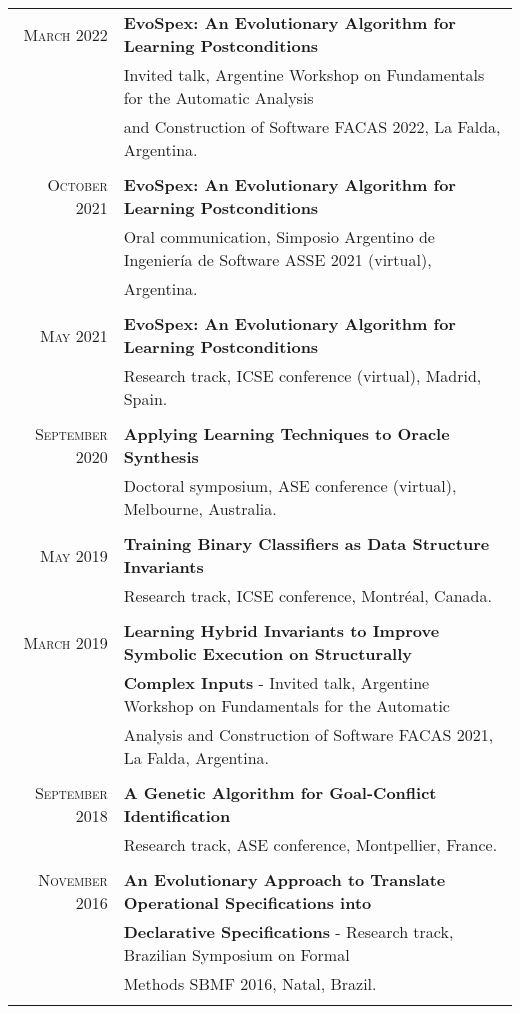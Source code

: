 \documentclass[a4paper,10pt]{article} %
\begin{document}
\begin{longtable}{rl}
\textsc{March} 2022 & \textbf{EvoSpex: An Evolutionary Algorithm for Learning Postconditions} \\ 
& Invited talk, Argentine Workshop on Fundamentals for the Automatic Analysis \\ 
& and Construction of Software FACAS 2022, La Falda, Argentina. \\ & \\

\textsc{October} 2021 & \textbf{EvoSpex: An Evolutionary Algorithm for Learning Postconditions} \\ 
& Oral communication, Simposio Argentino de Ingeniería de Software ASSE 2021 (virtual), \\ 
& Argentina. \\ & \\

\textsc{May} 2021 & \textbf{EvoSpex: An Evolutionary Algorithm for Learning Postconditions} \\ 
& Research track, ICSE conference (virtual), Madrid, Spain. \\ & \\

\textsc{September} 2020 & \textbf{Applying Learning Techniques to Oracle Synthesis} \\ 
& Doctoral symposium, ASE conference (virtual), Melbourne, Australia. \\ & \\

\textsc{May} 2019 & \textbf{Training Binary Classifiers as Data Structure Invariants} \\ 
& Research track, ICSE conference, Montréal, Canada. \\ & \\

\textsc{March} 2019 & \textbf{Learning Hybrid Invariants to Improve Symbolic Execution on Structurally} \\ 
& \textbf{Complex Inputs} - Invited talk, Argentine Workshop on Fundamentals for the Automatic \\ 
& Analysis and Construction of Software FACAS 2021, La Falda, Argentina. \\ & \\

\textsc{September} 2018 & \textbf{A Genetic Algorithm for Goal-Conflict Identification} \\ 
& Research track, ASE conference, Montpellier, France. \\ & \\

\textsc{November} 2016 & \textbf{An Evolutionary Approach to Translate Operational Specifications into} \\
& \textbf{Declarative Specifications} - Research track, Brazilian Symposium on Formal \\ 
& Methods SBMF 2016, Natal, Brazil. \\ & \\

\end{longtable}
\end{document}
